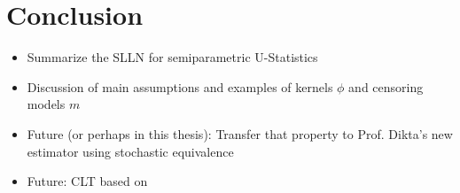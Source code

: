 \chapter{Conclusion}
\begin{itemize}
	\item Summarize the SLLN for semiparametric U-Statistics
	\item Discussion of main assumptions and examples of kernels $\phi$ and censoring models $m$
	\item Future (or perhaps in this thesis): Transfer that property to Prof. Dikta's new estimator using stochastic equivalence
	\item Future: CLT based on \cite{bose2002asymptotic}
\end{itemize}
